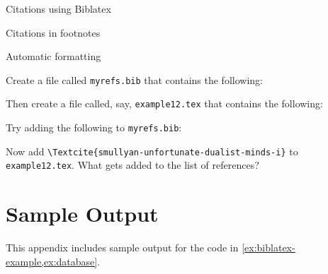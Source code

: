 \begin{frame}{Citations using Biblatex}

  \begin{block}{Citations in footnotes}
    \alert<1>{%
        }
  \end{block}

  \begin{block}{Automatic formatting}
    \alert<2>{%
        }
  \end{block}

\end{frame}


\begin{exercise}\label{ex:database}
  Create a file called \texttt{myrefs.bib} that contains the following: 

  Then create a file called, say, \texttt{example12.tex} that contains the following: 

  Try adding the following to \texttt{myrefs.bib}:
  

  Now add \verb|\Textcite{smullyan-unfortunate-dualist-minds-i}| to \texttt{example12.tex}.
  What gets added to the list of references?

\end{exercise}


\appendix\label{app}
\section<1-| beamer:0>{Sample Output}\label{sec:samples}

This appendix includes sample output for the code in \cref{ex:biblatex-example,ex:database}.

